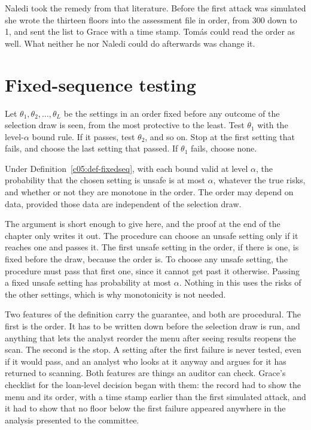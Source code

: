 Naledi took the remedy from that literature. Before the first attack was simulated she
wrote the thirteen floors into the assessment file in order, from 300 down to 1, and sent
the list to Grace with a time stamp. Tomás could read the order as well. What neither he
nor Naledi could do afterwards was change it.

\section{Fixed-sequence testing}

\begin{definition}\label{c05:def-fixedseq}
Let $\theta_1, \theta_2, \dots, \theta_L$ be the settings in an order fixed before any
outcome of the selection draw is seen, from the most protective to the least. Test
$\theta_1$ with the level-$\alpha$ bound rule. If it passes, test $\theta_2$, and so on.
Stop at the first setting that fails, and choose the last setting that passed. If
$\theta_1$ fails, choose none.
\end{definition}

\begin{proposition}\label{c05:prop-fixedseq}
Under Definition~\ref{c05:def-fixedseq}, with each bound valid at level $\alpha$, the
probability that the chosen setting is unsafe is at most $\alpha$, whatever the true
risks, and whether or not they are monotone in the order. The order may depend on data,
provided those data are independent of the selection draw.
\end{proposition}

The argument is short enough to give here, and the proof at the end of the chapter only
writes it out. The procedure can choose an unsafe setting only if it reaches one and
passes it. The first unsafe setting in the order, if there is one, is fixed before the
draw, because the order is. To choose any unsafe setting, the procedure must pass that
first one, since it cannot get past it otherwise. Passing a fixed unsafe setting has
probability at most $\alpha$. Nothing in this uses the risks of the other settings, which
is why monotonicity is not needed.

Two features of the definition carry the guarantee, and both are procedural. The first is
the order. It has to be written down before the selection draw is run, and anything that
lets the analyst reorder the menu after seeing results reopens the scan. The second is
the stop. A setting after the first failure is never tested, even if it would pass, and
an analyst who looks at it anyway and argues for it has returned to scanning. Both
features are things an auditor can check. Grace's checklist for the loan-level decision
began with them: the record had to show the menu and its order, with a time stamp
earlier than the first simulated attack, and it had to show that no floor below the
first failure appeared anywhere in the analysis presented to the committee.

